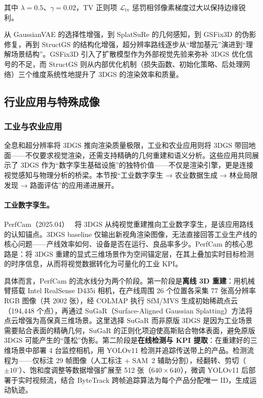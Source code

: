 其中 $\lambda=0.5$、$\gamma=0.02$，TV 正则项 $\mathcal{L}_{\mathrm{tv}}$ 惩罚相邻像素梯度过大以保持边缘锐利。

从 GaussianVAE 的选择性增强，到 SplatSuRe 的几何感知，到 GSFix3D 的伪影修复，再到 StructGS 的结构化增强，超分辨率路线逐步从“增加基元”演进到“理解场景结构”。GSFix3D 引入了扩散模型作为外部视觉先验来弥补 3DGS 优化信号的不足，而 StructGS 则从内部优化机制（损失函数、初始化策略、后处理网络）三个维度系统性地提升了 3DGS 的渲染效率和质量。

\subsection{行业应用与特殊成像}

\subsubsection{工业与农业应用}

全息和超分辨率将 3DGS 推向渲染质量极限，工业和农业应用则将 3DGS 带回地面——不仅要求视觉渲染，还需支持精确的几何重建和语义分析。这些应用共同展示了 3DGS 作为“数字孪生基础设施”的独特价值——不仅是渲染引擎，更是连接视觉感知与物理分析的桥梁。本节按“工业数字孪生 → 农业数据生成 → 林业局限发现 → 路面评估”的应用递进展开。

\paragraph{工业数字孪生。}

PerfCam（2025.04）~\cite{2504_18165} 将 3DGS 从纯视觉重建推向工业数字孪生，是该应用路线的认知锚点。3DGS baseline 仅输出新视角渲染图像，无法直接回答工业生产线的核心问题——产线效率如何、设备是否在运行、良品率多少。PerfCam 的核心思路是：将 3DGS 重建的显式三维场景作为空间锚定层，在其上叠加实时目标检测的时序信息，从而将视觉数据转化为可量化的工业 KPI。

具体而言，PerfCam 的流水线分为两个阶段。第一阶段是\textbf{离线 3D 重建}：用机械臂搭载 Intel RealSense D435i 相机，在产线周围 26 个位置各采集 77 张高分辨率 RGB 图像（共 2002 张），经 COLMAP 执行 SfM/MVS 生成初始稀疏点云（194{,}448 个点），再通过 SuGaR（Surface-Aligned Gaussian Splatting）方法将点云增强为高保真三维场景。这里选择 SuGaR 而非原版 3DGS 是因为工业场景需要贴合表面的精确几何，SuGaR 的正则化项迫使高斯贴合物体表面，避免原版 3DGS 可能产生的“蓬松”伪影。第二阶段是\textbf{在线检测与 KPI 提取}：在重建好的三维场景中部署 4 台监控相机，用 YOLOv11 检测并追踪传送带上的产品。检测流程为——仅标注 29 帧图像（人工标注 + SAM~2 辅助分割），经翻转、剪切（$\pm10^{\circ}$）、饱和度调整等数据增强扩展至 512 张（$640 \times 640$），微调 YOLOv11 后部署于实时视频流，结合 ByteTrack 跨帧追踪算法为每个产品分配唯一 ID，生成运动轨迹。


